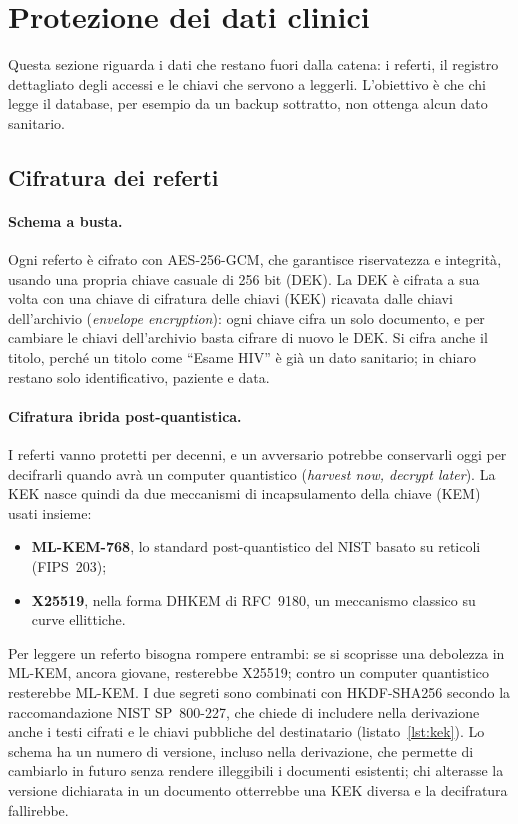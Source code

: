 \section{Protezione dei dati clinici}\label{sec:dati}

Questa sezione riguarda i dati che restano fuori dalla catena: i referti, il registro dettagliato degli accessi e le chiavi che servono a leggerli. L'obiettivo è che chi legge il database, per esempio da un backup sottratto, non ottenga alcun dato sanitario.

\subsection{Cifratura dei referti}
\paragraph{Schema a busta.} Ogni referto è cifrato con AES-256-GCM, che garantisce riservatezza e integrità\cite{sp800-38d}, usando una propria chiave casuale di 256 bit (DEK). La DEK è cifrata a sua volta con una chiave di cifratura delle chiavi (KEK) ricavata dalle chiavi dell'archivio (\emph{envelope encryption}): ogni chiave cifra un solo documento, e per cambiare le chiavi dell'archivio basta cifrare di nuovo le DEK. Si cifra anche il titolo, perché un titolo come ``Esame HIV'' è già un dato sanitario; in chiaro restano solo identificativo, paziente e data.

\paragraph{Cifratura ibrida post-quantistica.} I referti vanno protetti per decenni, e un avversario potrebbe conservarli oggi per decifrarli quando avrà un computer quantistico (\emph{harvest now, decrypt later}). La KEK nasce quindi da due meccanismi di incapsulamento della chiave (KEM) usati insieme:
\begin{itemize}
  \item \textbf{ML-KEM-768}, lo standard post-quantistico del NIST basato su reticoli (FIPS~203\cite{fips203});
  \item \textbf{X25519}, nella forma DHKEM di RFC~9180\cite{rfc9180}, un meccanismo classico su curve ellittiche.
\end{itemize}
Per leggere un referto bisogna rompere entrambi: se si scoprisse una debolezza in ML-KEM, ancora giovane, resterebbe X25519; contro un computer quantistico resterebbe ML-KEM. I due segreti sono combinati con HKDF-SHA256 secondo la raccomandazione NIST SP~800-227\cite{sp800-227}, che chiede di includere nella derivazione anche i testi cifrati e le chiavi pubbliche del destinatario (listato~\ref{lst:kek}). Lo schema ha un numero di versione, incluso nella derivazione, che permette di cambiarlo in futuro senza rendere illeggibili i documenti esistenti; chi alterasse la versione dichiarata in un documento otterrebbe una KEK diversa e la decifratura fallirebbe.

